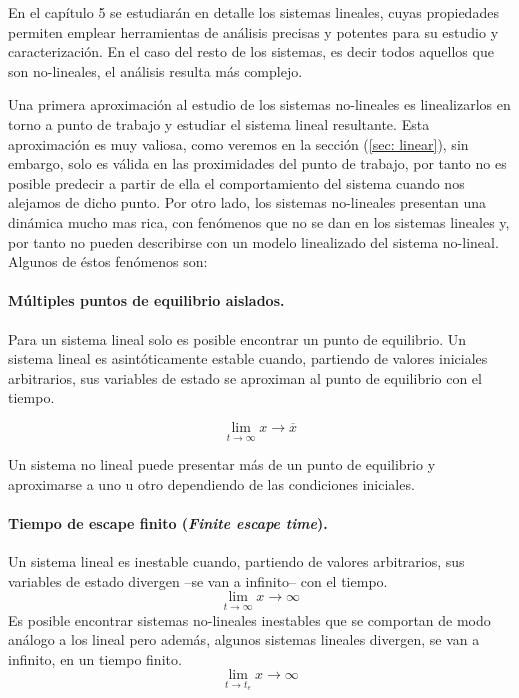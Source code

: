 En el capítulo 5 se estudiarán en detalle los sistemas lineales, cuyas propiedades permiten emplear herramientas de análisis precisas y potentes para su estudio y caracterización. En el caso del resto de los sistemas, es decir todos aquellos que son no-lineales, el análisis resulta más complejo.

Una primera aproximación al estudio de los sistemas no-lineales es linealizarlos en torno a punto de trabajo y estudiar el sistema lineal resultante. Esta aproximación es muy valiosa, como  veremos en la sección (\ref{sec: linear}), sin embargo, solo es válida en las proximidades del punto de trabajo, por tanto no es posible predecir a partir de ella el comportamiento del sistema cuando nos alejamos de dicho punto. Por otro lado, los sistemas no-lineales presentan una dinámica mucho mas rica, con fenómenos que no se dan en los sistemas lineales y, por tanto no pueden describirse con un modelo linealizado del sistema no-lineal. Algunos de éstos fenómenos son:

\paragraph{Múltiples puntos de equilibrio aislados.} Para un sistema lineal solo es posible encontrar un punto de equilibrio.  Un sistema lineal es asintóticamente estable cuando, partiendo de valores iniciales arbitrarios, sus variables de estado se aproximan al punto de equilibrio con el tiempo. 

\begin{equation}
\lim_{ t \to \infty} x \to \overline x
\end{equation}


Un sistema no lineal puede presentar más de un punto de equilibrio y aproximarse a uno u otro dependiendo de las condiciones iniciales.

\paragraph{Tiempo de escape finito (\emph{Finite escape time}).} Un sistema lineal es inestable cuando, partiendo de valores arbitrarios, sus variables de estado divergen --se van a infinito-- con el tiempo.
\begin{equation}
\lim_{ t \to \infty} x \to \infty
\end{equation}
Es posible encontrar sistemas no-lineales inestables que se comportan de modo análogo a los lineal pero además, algunos sistemas lineales divergen, se van a infinito, en un tiempo finito. 
\begin{equation}
\lim_{ t \to t_e} x \to \infty
\end{equation}

